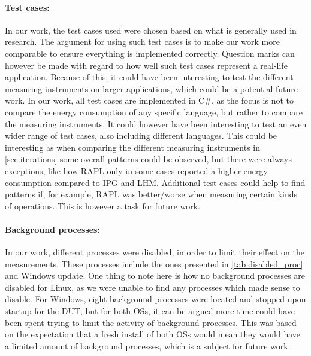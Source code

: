\paragraph*{Test cases:} In our work, the test cases used were chosen based on what is generally used in research\cite[]{Koedijk2022diff, greenland2016statistical}. The argument for using such test cases is to make our work more comparable to ensure everything is implemented correctly. Question marks can however be made with regard to how well such test cases represent a real-life application. Because of this, it could have been interesting to test the different measuring instruments on larger applications, which could be a potential future work. In our work, all test cases are implemented in C\#, as the focus is not to compare the energy consumption of any specific language, but rather to compare the measuring instruments. It could however have been interesting to test an even wider range of test cases, also including different languages. This could be interesting as when comparing the different measuring instruments in \cref{sec:iterations} some overall patterns could be observed, but there were always exceptions, like how RAPL only in some cases reported a higher energy consumption compared to IPG and LHM. Additional test cases could help to find patterns if, for example, RAPL was better/worse when measuring certain kinds of operations. This is however a task for future work.  

\paragraph*{Background processes:} In our work, different processes were disabled, in order to limit their effect on the measurements. These processes include the ones presented in \cref{tab:disabled_proc} and Windows update. One thing to note here is how no background processes are disabled for Linux, as we were unable to find any processes which made sense to disable. For Windows, eight background processes were located and stopped upon startup for the DUT, but for both OSs, it can be argued more time could have been spent trying to limit the activity of background processes. This was based on the expectation that a fresh install of both OSs would mean they would have a limited amount of background processes, which is a subject for future work. 

